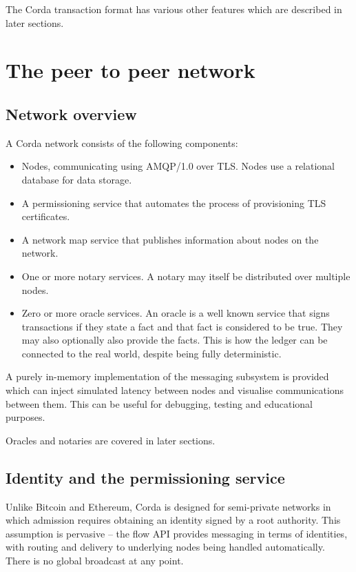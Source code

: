 \documentclass{article}
\begin{document}
The Corda transaction format has various other features which are described in later sections.

\section{The peer to peer network}

\subsection{Network overview}
A Corda network consists of the following components:

\begin{itemize}
\item Nodes, communicating using AMQP/1.0 over TLS. Nodes use a relational database for data storage.
\item A permissioning service that automates the process of provisioning TLS certificates.
\item A network map service that publishes information about nodes on the network.
\item One or more notary services. A notary may itself be distributed over multiple nodes.
\item Zero or more oracle services. An oracle is a well known service that signs transactions if they state a fact
and that fact is considered to be true. They may also optionally also provide the facts. This is how the ledger can be
connected to the real world, despite being fully deterministic.
\end{itemize}

A purely in-memory implementation of the messaging subsystem is provided which can inject simulated latency between
nodes and visualise communications between them. This can be useful for debugging, testing and educational purposes.

Oracles and notaries are covered in later sections.

\subsection{Identity and the permissioning service}

Unlike Bitcoin and Ethereum, Corda is designed for semi-private networks in which admission requires obtaining an
identity signed by a root authority. This assumption is pervasive -- the flow API provides messaging in terms of identities,
with routing and delivery to underlying nodes being handled automatically. There is no global broadcast at any point.
\end{document}
